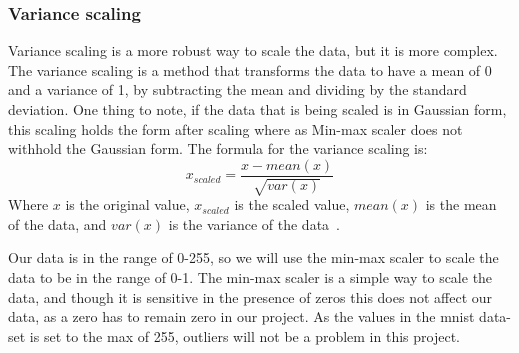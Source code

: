 \subsubsection{Variance scaling}\label{sec:variance-scaling}
Variance scaling is a more robust way to scale the data, but it is more complex. The variance scaling is a method that transforms the data to have a mean of 0 and a variance of 1, by subtracting the mean and dividing by the standard deviation. One thing to note, if the data that is being scaled is in Gaussian form, this scaling holds the form after scaling where as Min-max scaler does not withhold the Gaussian form. The formula for the variance scaling is:
\begin{equation}
    x_{scaled} = \frac{x - mean(x)}{\sqrt{var(x)}}
\end{equation}
Where $x$ is the original value, $x_{scaled}$ is the scaled value, $mean(x)$ is the mean of the data, and $var(x)$ is the variance of the data~\cite{Feature-engineering-zheng}. 

Our data is in the range of 0-255, so we will use the min-max scaler to scale the data to be in the range of 0-1. The min-max scaler is a simple way to scale the data, and though it is sensitive in the presence of zeros this does not affect our data, as a zero has to remain zero in our project. As the values in the \gls{mnist} data-set is set to the max of 255, outliers will not be a problem in this project.